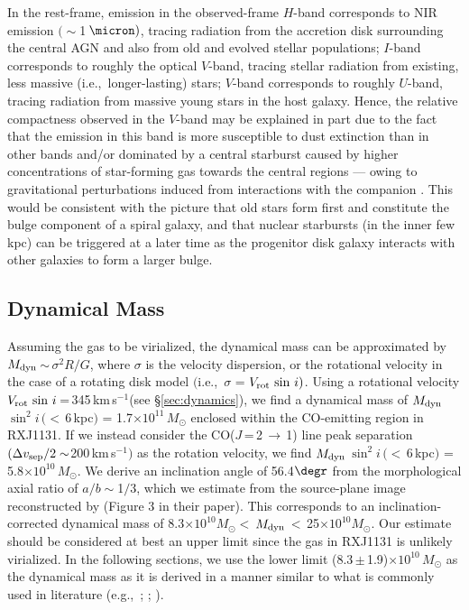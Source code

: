 \documentclass[]{emulateapj}
\newcommand{\Msun}{\mbox{$M_{\odot}$}\xspace}
\newcommand{\rarr}{$\rightarrow$}
\newcommand{\bco}{\mbox{CO($J$\,=\,2\,\rarr\,1)}\xspace}
\newcommand{\kms}{\mbox{km\,s$^{-1}$}\xspace}
\newcommand{\E}[1]{\mbox{$\times10^{#1}$}}
\newcommand{\ssim}{\,$\sim$\,}
\newcommand{\pmm}{\,$\pm$\,}
\newcommand{\eg}{{e.g.,~}}
\newcommand{\ie}{{i.e.,~}}
\newcommand{\Sec}[1]{\S\ref{sec:#1}}
\begin{document}
In the rest-frame,
emission in the observed-frame $H$-band corresponds to NIR emission $(\sim$1\,$\micron)$,
tracing radiation from the accretion disk surrounding
the central AGN and also from old and evolved stellar populations;
$I$-band corresponds to roughly the optical $V$-band, tracing stellar radiation from
existing, less massive (\ie longer-lasting) stars;
$V$-band corresponds to roughly $U$-band,  tracing radiation from massive young stars
in the host galaxy. Hence,
the relative compactness observed in the $V$-band may be explained in part
due to the fact that the emission in this band is
more susceptible to dust extinction than in other bands and/or dominated by
a central starburst caused by higher
concentrations of star-forming gas towards the central regions --- owing to
gravitational perturbations induced
from interactions with the companion
\citep[\eg][]{DiMatteo05a}.
This would be consistent with the picture that old stars form first and constitute the bulge component
of a spiral galaxy, and that nuclear starbursts (in the inner few kpc) can be triggered
at a later time as the progenitor disk galaxy interacts with other galaxies to form a larger bulge.

\subsection{Dynamical Mass}\label{sec:dyn}
Assuming the gas to be virialized,
the dynamical mass can be approximated by
$M_{\rm dyn}$\ssim$\sigma^2 R / G$,
where $\sigma$ is the velocity dispersion, or the rotational velocity in the case of a rotating disk model
$($\ie $\sigma$ = $V_{\rm rot}\, \sin\, i)$.
Using a rotational velocity $V_{\rm rot} \, \sin\, i$\,=\,345\,\kms (see \Sec{dynamics}),
we find a dynamical mass of
$M_{\rm dyn}$\,$\sin^2 i$\,$(<$\,6\,kpc$)$ = 1.7\E{11}\,\Msun enclosed
within the CO-emitting region in RXJ1131.
If we instead consider the
\bco line peak separation $(\Delta v_{\rm sep}/2 \sim$200\,\kms$)$ as the rotation velocity, we find
$M_{\rm dyn}$\,$\sin^2 i$\,$(<$\,6\,kpc$)$ = 5.8\E{10}\,\Msun.
We derive an inclination angle of 56.4$\degr$ from the
morphological axial ratio of $a/b\sim$1$/$3, which we estimate
from the source-plane image reconstructed by  (Figure 3 in their paper).
This corresponds to an inclination-corrected dynamical mass of
8.3\E{10}\Msun$<$\,$M_{\rm dyn}$\,$<$\,25\E{10}\Msun.
Our estimate should be considered at best an upper limit since
the gas in RXJ1131 is unlikely virialized.
In the following sections, we use the
lower limit (8.3\pmm1.9)\E{10}\,\Msun as the dynamical mass as it is
derived in a manner similar to what is commonly used in literature
(\eg \citealt[hereafter S97]{Solomon97a}; \citealt[hereafter DS98]{Downes98a}; \citealt[hereafter G05]{Greve05a}).
\end{document}

